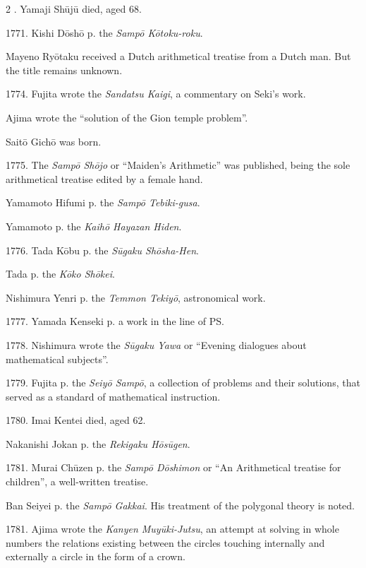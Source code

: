 \documentclass[11pt]{article}
\newcommand{\scanfooter}{}
\begin{document}
\begin{multicols}{2}
. Yamaji Shūjū died, aged 68.

1771. Kishi Dōshō p. the \emph{Sampō Kōtoku-roku}.

Mayeno Ryōtaku received a Dutch arithmetical treatise from a Dutch man. But the title remains unknown.

1774. Fujita wrote the \emph{Sandatsu Kaigi}, a commentary on Seki's work.

Ajima wrote the ``solution of the Gion temple problem''.

Saitō Gichō was born.

1775. The \emph{Sampō Shōjo} or ``Maiden's Arithmetic'' was published, being the sole arithmetical treatise edited by a female hand.

Yamamoto Hifumi p. the \emph{Sampō Tebiki-gusa}.

Yamamoto p. the \emph{Kaihō Hayazan Hiden}.

1776. Tada Kōbu p. the \emph{Sūgaku Shōsha-Hen}.

Tada p. the \emph{Kōko Shōkei}.

Nishimura Yenri p. the \emph{Temmon Tekiyō}, astronomical work.

1777. Yamada Kenseki p. a work in the line of PS.

1778. Nishimura wrote the \emph{Sūgaku Yawa} or ``Evening dialogues about mathematical subjects''.

1779. Fujita p. the \emph{Seiyō Sampō}, a collection of problems and their solutions, that served as a standard of mathematical instruction.

1780. Imai Kentei died, aged 62.

Nakanishi Jokan p. the \emph{Rekigaku Hōsūgen}.

1781. Murai Chūzen p. the \emph{Sampō Dōshimon} or ``An Arithmetical treatise for children'', a well-written treatise.

Ban Seiyei p. the \emph{Sampō Gakkai}. His treatment of the polygonal theory is noted.

1781. Ajima wrote the \emph{Kanyen Muyūki-Jutsu}, an attempt at solving in whole numbers the relations existing between the circles touching internally and externally a circle in the form of a crown.
\end{multicols}
\scanfooter
\end{document}
